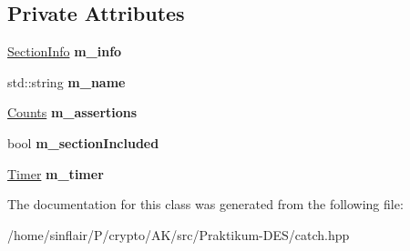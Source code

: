 \subsection*{Private Attributes}
\begin{DoxyCompactItemize}
\item 
\mbox{\label{classCatch_1_1Section_a22f54832b33b341ae5a78807a6219af6}} 
\hyperlink{structCatch_1_1SectionInfo}{Section\+Info} {\bfseries m\+\_\+info}
\item 
\mbox{\label{classCatch_1_1Section_a29a372077fda582bbd79fb192067f277}} 
std\+::string {\bfseries m\+\_\+name}
\item 
\mbox{\label{classCatch_1_1Section_ae0a2acc394d4bd1bc7a51a1445d25034}} 
\hyperlink{structCatch_1_1Counts}{Counts} {\bfseries m\+\_\+assertions}
\item 
\mbox{\label{classCatch_1_1Section_a038bb0d5d2718df6e3ae1ece4b3d695d}} 
bool {\bfseries m\+\_\+section\+Included}
\item 
\mbox{\label{classCatch_1_1Section_a1548993afa64305a1b093391c6884b7e}} 
\hyperlink{classCatch_1_1Timer}{Timer} {\bfseries m\+\_\+timer}
\end{DoxyCompactItemize}


The documentation for this class was generated from the following file\+:\begin{DoxyCompactItemize}
\item 
/home/sinflair/\+P/crypto/\+A\+K/src/\+Praktikum-\/\+D\+E\+S/catch.\+hpp\end{DoxyCompactItemize}

